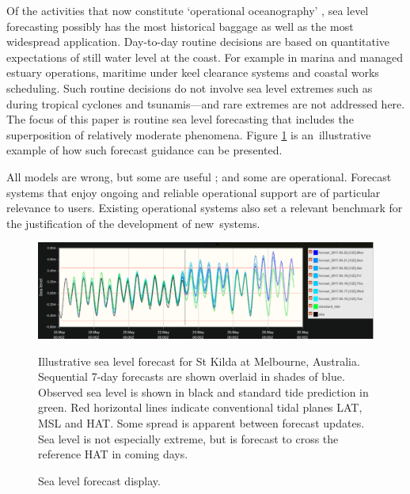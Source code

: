 Of the activities that now constitute `operational oceanography' \citep{Bell:2009uv}, sea level forecasting possibly has the most historical baggage as well as the most widespread application.
Day-to-day routine decisions are based on quantitative expectations of still water level \citep{Pugh:2014di} at the coast.  
For example in marina and managed estuary operations, maritime under keel clearance systems and coastal works scheduling. 
Such routine decisions do not involve sea level extremes such as during tropical cyclones and tsunamis---and rare extremes are not addressed here. 
The focus of this paper is routine sea level forecasting that includes the superposition of relatively moderate phenomena.
Figure \ref{fig:fc_eg} is an~illustrative example of how such forecast guidance can be presented. 


All models are wrong, but some are useful \citep{Box:1979wz}; and some are operational.        %
Forecast systems that enjoy ongoing and reliable operational support are of particular relevance to users.
Existing operational systems also set a relevant benchmark for the justification of the development of new~systems.  

\begin{figure}[H]
\centering
\includegraphics[width=1\textwidth]{figures/plots/forecast_eg.png}
\caption{Sea level forecast display.}{Illustrative sea level forecast for St Kilda at Melbourne, Australia.  Sequential 7-day forecasts are shown overlaid in shades of blue.  Observed sea level is shown in black and standard tide prediction in green.  Red horizontal lines indicate conventional tidal planes LAT, MSL and HAT.  Some spread is apparent between forecast updates.  Sea level is not especially extreme, but is forecast to cross the reference HAT in coming days.}
\label{fig:fc_eg}
\end{figure}   


